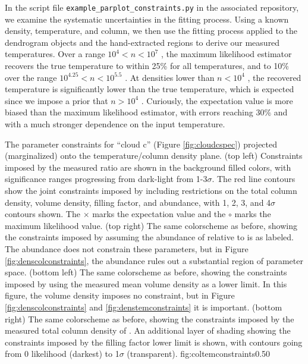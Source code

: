In the script file \texttt{example\_parplot\_constraints.py} in the associated
repository, we examine the systematic uncertainties in the fitting process.
Using a known density, temperature, and column, we then use the fitting process
applied to the dendrogram objects and the hand-extracted regions to derive our
measured temperatures.  Over a range $10^4 < n < 10^7$ \percc, the maximum
likelihood estimator recovers the true temperature to within 25\% for all
temperatures, and to 10\% over the range $10^{4.25} < n < 10^5.5$ \percc.  At
densities lower than $n<10^4$ \percc, the recovered temperature is
significantly lower than the true temperature, which is expected since we
impose a prior that $n>10^4$ \percc.  Curiously, the expectation value is more
biased than the maximum likelihood estimator, with errors reaching 30\% and
with a much stronger dependence on the input temperature.

{The parameter constraints for ``cloud c'' (Figure \ref{fig:cloudcspec})
projected (marginalized) onto the temperature/column density plane.\newline
(top left) Constraints imposed by the measured ratio \Rone are shown in the
background filled colors,
with significance ranges progressing from dark-light from 1-3$\sigma$.  The
red line contours show the joint constraints imposed by including
restrictions on the
total column density, volume density,  filling factor, and abundance, with
1, 2, 3, and 4$\sigma$ contours shown.
The $\times$ marks the expectation value and the $\circ$ marks the maximum
likelihood value.
\newline
(top right) The same colorscheme as before, showing the constraints imposed by
assuming the abundance of \para relative to \hh is as labeled.  
The abundance does not constrain these parameters, but in Figure
\ref{fig:denscolconstraints}, the abundance rules out a substantial region of parameter
space.
\newline
(bottom left) The same colorscheme as before, showing the constraints imposed
by using the measured mean volume density as a lower limit.  In this figure,
the volume density imposes no constraint, but in Figure \ref{fig:denscolconstraints}
and \ref{fig:denstemconstraints} it is important.
\newline
(bottom right) The same colorscheme as before, showing the constraints imposed
by the measured total column density of \hh.  An additional layer of shading
showing the constraints imposed by the filling factor lower limit is shown,
with contours going from 0 likelihood (darkest) to 1$\sigma$ (transparent).}
{fig:coltemconstraints}{0.5}{0}

